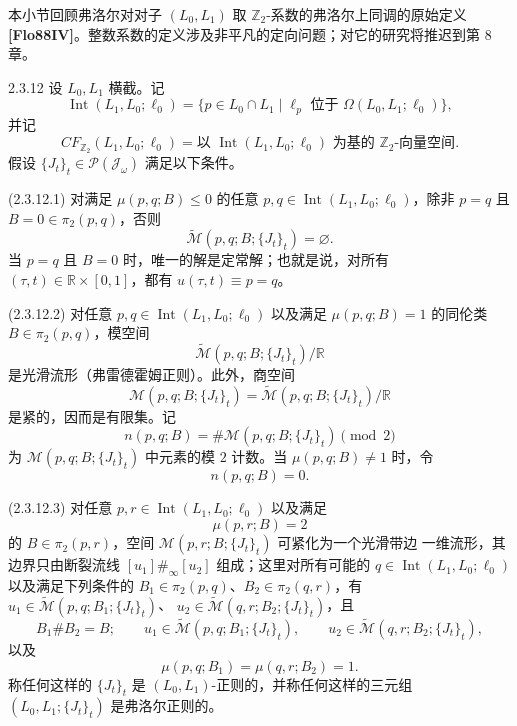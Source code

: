 本小节回顾弗洛尔对对子 $(L_0,L_1)$ 取 $\mathbb Z_2$-系数的弗洛尔上同调的原始定义
\textbf{[Flo88IV]}。整数系数的定义涉及非平凡的定向问题；对它的研究将推迟到第 8 章。

\begin{definition}{2.3.12}\label{def:2-3-12}
设 $L_0,L_1$ 横截。记
\[
  \operatorname{Int}(L_1,L_0;\ell_0)
  =\{p\in L_0\cap L_1
    \mid \ell_p\text{ 位于 }\Omega(L_0,L_1;\ell_0)\},
\]
并记
\[
  CF_{\mathbb Z_2}(L_1,L_0;\ell_0)
  =\text{以 }\operatorname{Int}(L_1,L_0;\ell_0)
    \text{ 为基的 }\mathbb Z_2\text{-向量空间}.
\]
假设 $\{J_t\}_t\in\mathcal P(\mathcal J_\omega)$ 满足以下条件。

\par\smallskip\noindent\textup{(2.3.12.1)}\quad
对满足 $\mu(p,q;B)\leq0$ 的任意
$p,q\in\operatorname{Int}(L_1,L_0;\ell_0)$，除非
$p=q$ 且 $B=0\in\pi_2(p,q)$，否则
\[
  \widetilde{\mathcal M}(p,q;B;\{J_t\}_t)=\varnothing.
\]
当 $p=q$ 且 $B=0$ 时，唯一的解是定常解；也就是说，对所有
$(\tau,t)\in\mathbb R\times[0,1]$，都有 $u(\tau,t)\equiv p=q$。

\par\smallskip\noindent\textup{(2.3.12.2)}\quad
对任意 $p,q\in\operatorname{Int}(L_1,L_0;\ell_0)$ 以及满足
$\mu(p,q;B)=1$ 的同伦类 $B\in\pi_2(p,q)$，模空间
\[
  \widetilde{\mathcal M}(p,q;B;\{J_t\}_t)/\mathbb R
\]
是光滑流形（弗雷德霍姆正则）。此外，商空间
\[
  \mathcal M(p,q;B;\{J_t\}_t)
  =\widetilde{\mathcal M}(p,q;B;\{J_t\}_t)/\mathbb R
\]
是紧的，因而是有限集。记
\[
  n(p,q;B)=\#\mathcal M(p,q;B;\{J_t\}_t)\pmod2
\]
为 $\mathcal M(p,q;B;\{J_t\}_t)$ 中元素的模 $2$ 计数。当
$\mu(p,q;B)\neq1$ 时，令
\[
  n(p,q;B)=0.
\]

\par\smallskip\noindent\textup{(2.3.12.3)}\quad
对任意 $p,r\in\operatorname{Int}(L_1,L_0;\ell_0)$ 以及满足
\[
  \mu(p,r;B)=2
\]
的 $B\in\pi_2(p,r)$，空间 $\mathcal M(p,r;B;\{J_t\}_t)$ 可紧化为一个光滑带边
一维流形，其边界只由断裂流线 $[u_1]\#_\infty[u_2]$ 组成；这里对所有可能的
$q\in\operatorname{Int}(L_1,L_0;\ell_0)$ 以及满足下列条件的
$B_1\in\pi_2(p,q)$、$B_2\in\pi_2(q,r)$，有
$u_1\in\widetilde{\mathcal M}(p,q;B_1;\{J_t\}_t)$、
$u_2\in\widetilde{\mathcal M}(q,r;B_2;\{J_t\}_t)$，且
\[
  B_1\#B_2=B;
  \qquad
  u_1\in\widetilde{\mathcal M}(p,q;B_1;\{J_t\}_t),
  \qquad
  u_2\in\widetilde{\mathcal M}(q,r;B_2;\{J_t\}_t),
\]
以及
\[
  \mu(p,q;B_1)=\mu(q,r;B_2)=1.
\]
称任何这样的 $\{J_t\}_t$ 是 $(L_0,L_1)$-正则的，并称任何这样的三元组
$(L_0,L_1;\{J_t\}_t)$ 是弗洛尔正则的。
\end{definition}

